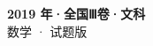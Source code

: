 \documentclass[zihao=-4, a4paper]{ctexart}
\begin{document}
\begin{center}
  {\Large\bfseries 2019 年·全国Ⅲ卷·文科}\\[4pt]
  {\large 数学 · 试题版}
\end{center}
\medskip
{}

\end{document}
